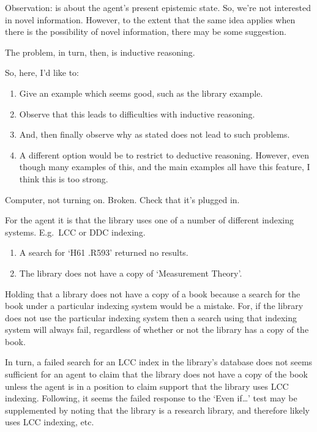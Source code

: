 \begin{note}
  \color{red}
  Observation:
  \zS{} is about the agent's present epistemic state.
  So, we're not interested in novel information.
  However, to the extent that the same idea applies when there is the possibility of novel information, there may be some suggestion.

  The problem, in turn, then, is inductive reasoning.

  So, here, I'd like to:
  \begin{enumerate}
  \item
    Give an example which seems good, such as the library example.
  \item
    Observe that this leads to difficulties with inductive reasoning.
  \item
    And, then finally observe why \zS{} as stated does not lead to such problems.
  \item
    A different option would be to restrict to deductive reasoning.
    However, even though many examples of this, and the main examples all have this feature, I think this is too strong.
  \end{enumerate}
\end{note}

\begin{note}
  \begin{illustration}
    Computer, not turning on.
    Broken.
    Check that it's plugged in.
  \end{illustration}
\end{note}

\begin{note}
  \begin{illustration}
    For the agent it is \epVAd{} that the library uses one of a number of different indexing systems.
    E.g.\ LCC or DDC indexing.
    \begin{enumerate}
    \item A search for `H61 .R593' returned no results.
    \item The library does not have a copy of `Measurement Theory'.
    \end{enumerate}
  \end{illustration}

  Holding that a library does not have a copy of a book because a search for the book under a particular indexing system would be a mistake.
  For, if the library does not use the particular indexing system then a search using that indexing system will always fail, regardless of whether or not the library has a copy of the book.

  In turn, a failed search for an LCC index in the library's database does not seems sufficient for an agent to claim that the library does not have a copy of the book unless the agent is in a position to claim support that the library uses LCC indexing.
  Following, it seems the failed response to the `Even if\dots' test may be supplemented by noting that the library is a research library, and therefore likely uses LCC indexing, etc.\
\end{note}

